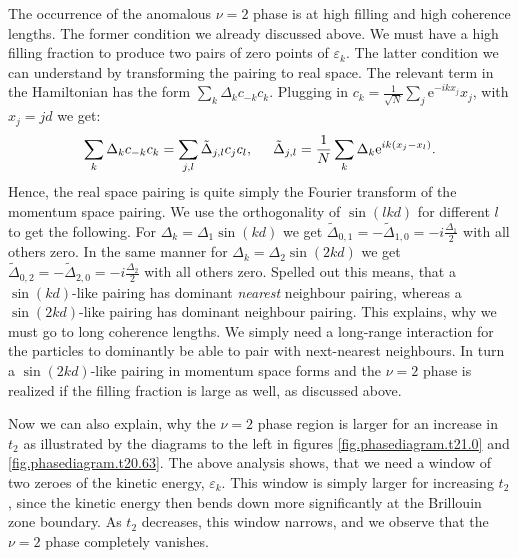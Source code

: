 The occurrence of the anomalous $\nu = 2$ phase is at high filling and high coherence lengths. The former condition we already discussed above. We must have a high filling fraction to produce two pairs of zero points of $\varepsilon_k$. The latter condition we can understand by transforming the pairing to real space. The relevant term in the Hamiltonian has the form $\sum_k \Delta_k c_{-k}c_{k}$. Plugging in $c_k = \frac{1}{\sqrt{N}}\sum_j \text{e}^{-ikx_j}x_j$, with $x_j = jd$ we get:
\begin{equation}
\sum_k \Delta_k c_{-k}c_{k} = \sum_{j,l} \tilde{\Delta}_{j,l}c_jc_l, \hspace{0.5cm} \tilde{\Delta}_{j,l} = \frac{1}{N}\sum_k\Delta_k\text{e}^{ik(x_j-x_l)}. \nonumber
\end{equation}
Hence, the real space pairing is quite simply the Fourier transform of the momentum space pairing. We use the orthogonality of $\sin(lkd)$ for different $l$ to get the following. For $\Delta_k = \Delta_1\sin(kd)$ we get $\tilde{\Delta}_{0,1} = -\tilde{\Delta}_{1,0} = -i\frac{\Delta_1}{2}$ with all others zero. In the same manner for $\Delta_k = \Delta_2\sin(2kd)$ we get $\tilde{\Delta}_{0,2} = -\tilde{\Delta}_{2,0} = -i\frac{\Delta_2}{2}$ with all others zero. Spelled out this means, that a $\sin(kd)$-like pairing has dominant \textit{nearest} neighbour pairing, whereas a $\sin(2kd)$-like pairing has dominant  neighbour pairing. This explains, why we must go to long coherence lengths. We simply need a long-range interaction for the particles to dominantly be able to pair with next-nearest neighbours. In turn a $\sin(2kd)$-like pairing in momentum space forms and the $\nu = 2$ phase is realized if the filling fraction is large as well, as discussed above. 

Now we can also explain, why the $\nu = 2$ phase region is larger for an increase in $t_2$ as illustrated by the diagrams to the left in figures \ref{fig.phasediagram.t21.0} and \ref{fig.phasediagram.t20.63}. The above analysis shows, that we need a window of two zeroes of the kinetic energy, $\varepsilon_k$. This window is simply larger for increasing $t_2$, since the kinetic energy then bends down more significantly at the Brillouin zone boundary. As $t_2$ decreases, this window narrows, and we observe that the $\nu = 2$ phase completely vanishes. 

